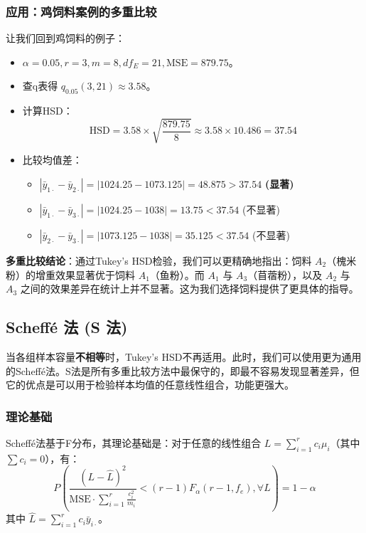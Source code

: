 \documentclass[12pt, a4paper]{amsart}
\begin{document}
\subsubsection{应用：鸡饲料案例的多重比较}
让我们回到鸡饲料的例子：
\begin{itemize}
    \item $\alpha=0.05, r=3, m=8, df_E=21, \text{MSE}=879.75$。
    \item 查q表得 $q_{0.05}(3, 21) \approx 3.58$。
    \item 计算HSD：
    $$ \text{HSD} = 3.58 \times \sqrt{\frac{879.75}{8}} \approx 3.58 \times 10.486 = 37.54 $$
    \item 比较均值差：
        \begin{itemize}
            \item $|\bar{y}_{1\cdot} - \bar{y}_{2\cdot}| = |1024.25 - 1073.125| = 48.875 > 37.54$ \textbf{(显著)}
            \item $|\bar{y}_{1\cdot} - \bar{y}_{3\cdot}| = |1024.25 - 1038| = 13.75 < 37.54$ (不显著)
            \item $|\bar{y}_{2\cdot} - \bar{y}_{3\cdot}| = |1073.125 - 1038| = 35.125 < 37.54$ (不显著)
        \end{itemize}
\end{itemize}
\textbf{多重比较结论}：通过Tukey's HSD检验，我们可以更精确地指出：饲料 $A_2$（槐米粉）的增重效果显著优于饲料 $A_1$（鱼粉）。而 $A_1$ 与 $A_3$（苜蓿粉），以及 $A_2$ 与 $A_3$ 之间的效果差异在统计上并不显著。这为我们选择饲料提供了更具体的指导。

\subsection{Scheffé 法 (S 法)}
当各组样本容量\textbf{不相等}时，Tukey's HSD不再适用。此时，我们可以使用更为通用的Scheffé法。S法是所有多重比较方法中最保守的，即最不容易发现显著差异，但它的优点是可以用于检验样本均值的任意线性组合，功能更强大。

\subsubsection{理论基础}
Scheffé法基于F分布，其理论基础是：对于任意的线性组合 $L = \sum_{i=1}^{r} c_i \mu_i$（其中 $\sum c_i = 0$），有：
\begin{equation}
P\left(\frac{(L - \hat{L})^2}{\text{MSE} \cdot \sum_{i=1}^{r} \frac{c_i^2}{m_i}} < (r-1)F_{\alpha}(r-1, f_e), \forall L \right) = 1 - \alpha
\end{equation}
其中 $\hat{L} = \sum_{i=1}^{r} c_i \bar{y}_{i\cdot}$。
\end{document}
